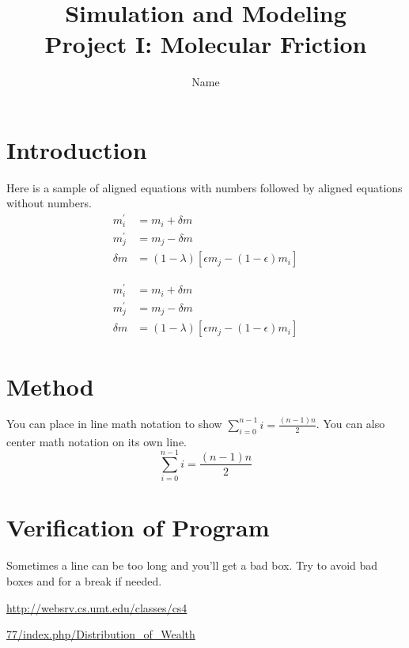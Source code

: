 \documentclass{article}%
\begin{document}
\title{Simulation and Modeling\\Project I: Molecular Friction}
\author{Name}
\maketitle

\twocolumn

\section{Introduction}
Here is a sample of aligned equations with numbers followed by aligned equations without numbers.
\begin{align}
	m^{\prime}_i	&	= m_i + \delta m\\
	m^{\prime}_j	&	= m_j - \delta m\\
	\delta m 			&	= (1 - \lambda)[\epsilon m_j - (1 - \epsilon)m_i]
\end{align}

\begin{align*}
	m^{\prime}_i	&	= m_i + \delta m\\
	m^{\prime}_j	&	= m_j - \delta m\\
	\delta m 			&	= (1 - \lambda)[\epsilon m_j - (1 - \epsilon)m_i]
\end{align*}

\section{Method}
You can place in line math notation to show $\sum^{n-1}_{i=0}{i} = \frac{(n-1)n}{2}$. You can also center math notation on its own line.
$$\sum^{n-1}_{i=0}{i} = \frac{(n-1)n}{2}$$

\section{Verification of Program}
Sometimes a line can be too long and you'll get a bad box. Try to avoid bad boxes and for a break if needed.

\noindent\url{http://websrv.cs.umt.edu/classes/cs4}

\noindent\url{77/index.php/Distribution_of_Wealth}
\end{document}
